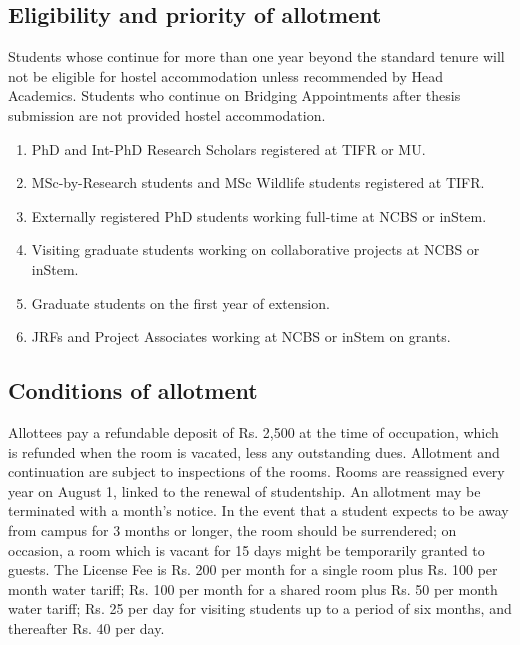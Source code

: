 \documentclass[a4paper]{extarticle}
\begin{document}
\subsection{Eligibility and priority of allotment}
Students whose continue for more than one year
beyond the standard tenure will not be eligible for hostel accommodation unless
recommended by Head Academics. Students who continue on Bridging Appointments after
thesis submission are not provided hostel accommodation.

\begin{enumerate}
    \item  PhD and Int-PhD Research Scholars registered at TIFR or MU.
    \item  MSc-by-Research students and MSc Wildlife students registered at TIFR.
    \item  Externally registered PhD students working full-time at NCBS or inStem.
    \item  Visiting graduate students working on collaborative projects at NCBS or inStem.
    \item  Graduate students on the first year of extension.
    \item  JRFs and Project Associates working at NCBS or inStem on grants.
\end{enumerate}

\subsection{Conditions of allotment}
Allottees pay a refundable deposit of Rs. 2,500 at the time of
occupation, which is refunded when the room is vacated, less any outstanding dues.
Allotment and continuation are subject to inspections of the rooms. Rooms are reassigned
every year on August 1, linked to the renewal of studentship. An allotment may be
terminated with a month’s notice. In the event that a student expects to be away from
campus for 3 months or longer, the room should be surrendered; on occasion, a room which
is vacant for 15 days might be temporarily granted to guests. The License Fee is Rs. 200 per
month for a single room plus Rs. 100 per month water tariff; Rs. 100 per month for a shared
room plus Rs. 50 per month water tariff; Rs. 25 per day for visiting students up to a period
of six months, and thereafter Rs. 40 per day.
\end{document}
